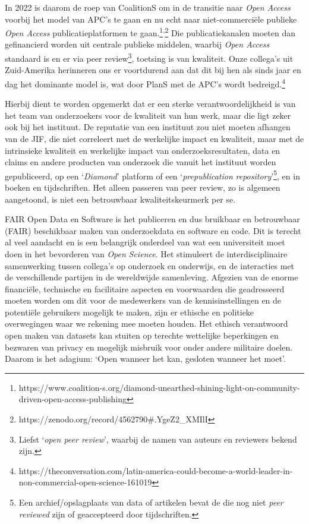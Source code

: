 \documentclass[smallauthor, chapterhaspagenum, nochapterinheader, pagenuminheader,  bigchapnum,medium2, tocpages, garamond, titleinheader]{jote-book}
\begin{document}
	In 2022 is daarom de roep van CoalitionS om in de transitie naar \emph{Open Access} voorbij het model van APC's te gaan en nu echt naar niet-commerciële publieke \emph{Open Access} publicatieplatformen te gaan.\footnote{https://www.coalition-s.org/diamond-unearthed-shining-light-on-community-driven-open-access-publishing}\textsuperscript{,}\footnote{https://zenodo.org/record/4562790\#.YgeZ2\_XMIlI} Die publicatiekanalen moeten dan gefinancierd worden uit centrale publieke middelen, waarbij \emph{Open Access} standaard is en er via peer review\footnote{Liefst ‘\emph{open peer review}', waarbij de namen van auteurs en reviewers bekend zijn.}, toetsing is van kwaliteit. Onze collega's uit Zuid-Amerika herinneren ons er voortdurend aan dat dit bij hen als sinds jaar en dag het dominante model is, wat door PlanS met de APC's wordt bedreigd.\footnote{https://theconversation.com/latin-america-could-become-a-world-leader-in-non-commercial-open-science-161019}



	Hierbij dient te worden opgemerkt dat er een sterke verantwoordelijkheid is van het team van onderzoekers voor de kwaliteit van hun werk, maar die ligt zeker ook bij het instituut. De reputatie van een instituut zou niet moeten afhangen van de JIF, die niet correleert met de werkelijke impact en kwaliteit, maar met de intrinsieke kwaliteit en werkelijke impact van onderzoeksresultaten, data en claims en andere producten van onderzoek die vanuit het instituut worden gepubliceerd, op een ‘\emph{Diamond}' platform of een ‘\emph{prepublication}\emph{ }\emph{repository}'\footnote{Een archief/opslagplaats van data of artikelen bevat de die nog niet \emph{peer }\emph{reviewed} zijn of geaccepteerd door tijdschriften.}, en in boeken en tijdschriften. Het alleen passeren van peer review, zo is algemeen aangetoond, is niet een betrouwbaar kwaliteitskeurmerk per se.



	FAIR Open Data en Software is het publiceren en dus bruikbaar en betrouwbaar (FAIR) beschikbaar maken van onderzoekdata en software en code. Dit is terecht al veel aandacht en is een belangrijk onderdeel van wat een universiteit moet doen in het bevorderen van \emph{Open }\emph{Science}. Het stimuleert de interdisciplinaire samenwerking tussen collega's op onderzoek en onderwijs, en de interacties met de verschillende partijen in de wereldwijde samenleving. Afgezien van de enorme financiële, technische en facilitaire aspecten en voorwaarden die geadresseerd moeten worden om dit voor de medewerkers van de kennisinstellingen en de potentiële gebruikers mogelijk te maken, zijn er ethische en politieke overwegingen waar we rekening mee moeten houden. Het ethisch verantwoord open maken van datasets kan stuiten op terechte wettelijke beperkingen en bezwaren van privacy en mogelijk misbruik voor onder andere militaire doelen. Daarom is het adagium: ‘Open wanneer het kan, gesloten wanneer het moet'.
\end{document}
